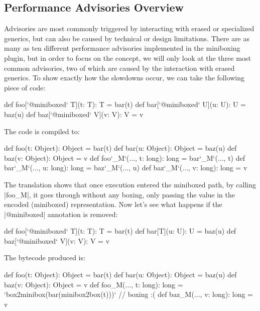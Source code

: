 \vspace{-0.6em}

\subsection{Performance Advisories Overview}

\vspace{-0.2em}

Advisories are most commonly triggered by interacting with erased or specialized generics, but can also be caused by technical or design limitations. There are as many as ten different performance advisories implemented in the miniboxing plugin, but in order to focus on the concept, we will only look at the three most common advisories, two of which are caused by the interaction with erased generics. To show exactly how the slowdowns occur, we can take the following piece of code:

\begin{lstlisting-nobreak}
 def foo[`@miniboxed` T](t: T): T = bar(t)
 def bar[`@miniboxed` U](u: U): U = baz(u)
 def baz[`@miniboxed` V](v: V): V = v
\end{lstlisting-nobreak}

The code is compiled to:

\begin{lstlisting-nobreak}
 def foo(t: Object): Object = bar(t)
 def bar(u: Object): Object = baz(u)
 def baz(v: Object): Object = v
 def foo`_M`(..., t: long): long = bar`_M`(..., t)
 def bar`_M`(..., u: long): long = baz`_M`(..., u)
 def baz`_M`(..., v: long): long = v
\end{lstlisting-nobreak}

The translation shows that once execution entered the miniboxed path, by calling |foo_M|, it goes through without any boxing, only passing the value in the encoded (miniboxed) representation. Now let's see what happens if the |@miniboxed| annotation is removed:

\begin{lstlisting-nobreak}
 def foo[`@miniboxed` T](t: T): T = bar(t)
 def bar[T](u: U): U = baz(u)
 def baz[`@miniboxed` V](v: V): V = v
\end{lstlisting-nobreak}

The bytecode produced is:

\begin{lstlisting-nobreak}
 def foo(t: Object): Object = bar(t)
 def bar(u: Object): Object = baz(u)
 def baz(v: Object): Object = v
 def foo_M(..., t: long): long = `box2minibox(bar(minibox2box(t)))` // boxing :(
 def baz_M(..., v: long): long = v
\end{lstlisting-nobreak}

